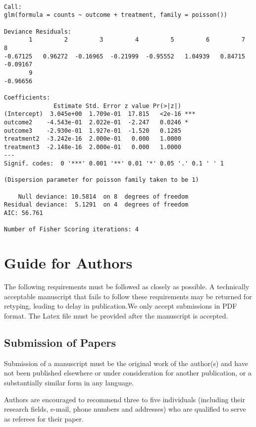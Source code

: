 \documentclass[letterpaper,inpress]{jdsart}
\begin{document}
\begin{verbatim}

Call:
glm(formula = counts ~ outcome + treatment, family = poisson())

Deviance Residuals: 
       1         2         3         4         5         6         7         8  
-0.67125   0.96272  -0.16965  -0.21999  -0.95552   1.04939   0.84715  -0.09167  
       9  
-0.96656  

Coefficients:
              Estimate Std. Error z value Pr(>|z|)    
(Intercept)  3.045e+00  1.709e-01  17.815   <2e-16 ***
outcome2    -4.543e-01  2.022e-01  -2.247   0.0246 *  
outcome3    -2.930e-01  1.927e-01  -1.520   0.1285    
treatment2  -3.242e-16  2.000e-01   0.000   1.0000    
treatment3  -2.148e-16  2.000e-01   0.000   1.0000    
---
Signif. codes:  0 '***' 0.001 '**' 0.01 '*' 0.05 '.' 0.1 ' ' 1

(Dispersion parameter for poisson family taken to be 1)

    Null deviance: 10.5814  on 8  degrees of freedom
Residual deviance:  5.1291  on 4  degrees of freedom
AIC: 56.761

Number of Fisher Scoring iterations: 4
\end{verbatim}

\hypertarget{guide-for-authors}{%
\section{Guide for Authors}\label{guide-for-authors}}

The following requirements must be followed as closely as possible. A
technically acceptable manuscript that fails to follow these requirements may be
returned for retyping, leading to delay in publication.We only accept
submissions in PDF format. The Latex file must be provided after the manuscript
is accepted.

\hypertarget{submission-of-papers}{%
\subsection{Submission of Papers}\label{submission-of-papers}}

Submission of a manuscript must be the original work of the author(s) and have
not been published elsewhere or under consideration for another publication, or
a substantially similar form in any language.

Authors are encouraged to recommend three to five individuals (including their
research fields, e-mail, phone numbers and addresses) who are qualified to serve
as referees for their paper.
\end{document}
